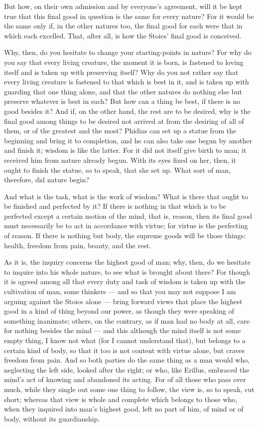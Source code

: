 But how, on their own admission and by everyone's agreement, will it be kept true that this final good in question is the same for every nature? For it would be the same only if, in the other natures too, the final good for each were that in which each excelled. That, after all, is how the Stoics' final good is conceived.

 Why, then, do you hesitate to change your starting-points in nature? For why do you say that every living creature, the moment it is born, is fastened to loving itself and is taken up with preserving itself? Why do you not rather say that every living creature is fastened to that which is best in it, and is taken up with guarding that one thing alone, and that the other natures do nothing else but preserve whatever is best in each? But how can a thing be best, if there is no good besides it? And if, on the other hand, the rest are to be desired, why is the final good among things to be desired not arrived at from the desiring of all of them, or of the greatest and the most? Phidias can set up a statue from the beginning and bring it to completion, and he can also take one begun by another and finish it; wisdom is like the latter. For it did not itself give birth to man; it received him from nature already begun. With its eyes fixed on her, then, it ought to finish the statue, so to speak, that she set up. What sort of man, therefore, did nature begin?

 And what is the task, what is the work of wisdom? What is there that ought to be finished and perfected by it? If there is nothing in that which is to be perfected except a certain motion of the mind, that is, reason, then its final good must necessarily be to act in accordance with virtue; for virtue is the perfecting of reason. If there is nothing but body, the supreme goods will be those things: health, freedom from pain, beauty, and the rest.

 As it is, the inquiry concerns the highest good of man; why, then, do we hesitate to inquire into his whole nature, to see what is brought about there? For though it is agreed among all that every duty and task of wisdom is taken up with the cultivation of man, some thinkers — and so that you may not suppose I am arguing against the Stoics alone — bring forward views that place the highest good in a kind of thing beyond our power, as though they were speaking of something inanimate; others, on the contrary, as if man had no body at all, care for nothing besides the mind — and this although the mind itself is not some empty thing, I know not what (for I cannot understand that), but belongs to a certain kind of body, so that it too is not content with virtue alone, but craves freedom from pain. And so both parties do the same thing as a man would who, neglecting the left side, looked after the right; or who, like Erillus, embraced the mind's act of knowing and abandoned its acting. For of all those who pass over much, while they single out some one thing to follow, the view is, so to speak, cut short; whereas that view is whole and complete which belongs to those who, when they inquired into man's highest good, left no part of him, of mind or of body, without its guardianship.

